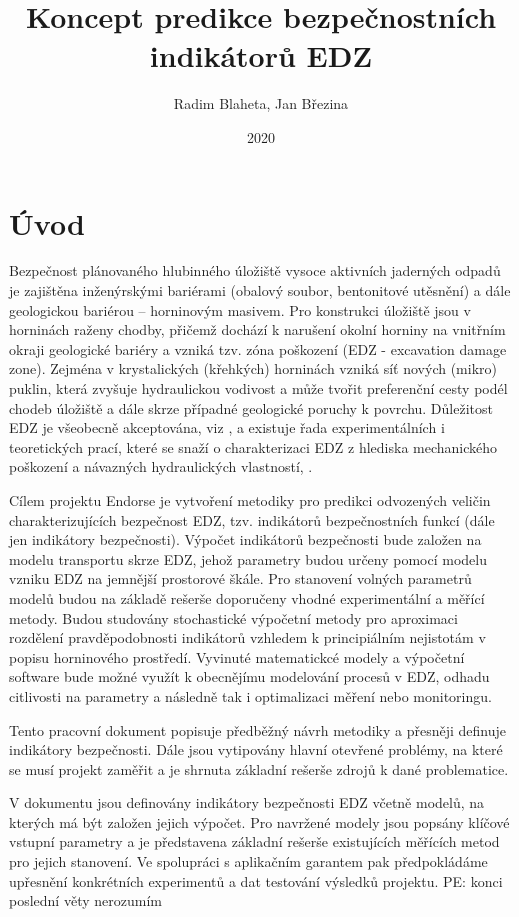 \documentclass{article}
\title{Koncept predikce bezpečnostních indikátorů EDZ}
\author{Radim Blaheta, Jan Březina}
\date{2020}
\newcommand{\pe}[1]{{\color{orange} PE: #1}}
\begin{document}
\maketitle


\section{Úvod}
Bezpečnost plánovaného hlubinného úložiště vysoce aktivních jaderných odpadů je zajištěna 
inženýrskými bariérami (obalový soubor, bentonitové utěsnění) a dále geologickou bariérou 
– horninovým masivem. Pro konstrukci úložiště jsou v horninách raženy chodby, přičemž dochází 
k narušení okolní horniny na vnitřním okraji geologické bariéry a vzniká tzv. zóna poškození 
(EDZ - excavation damage zone). 
Zejména v krystalických (křehkých) horninách vzniká síť nových (mikro) puklin, která zvyšuje 
hydraulickou vodivost a může tvořit preferenční cesty podél 
chodeb úložiště a dále skrze případné geologické poruchy k povrchu.
Důležitost EDZ je všeobecně
akceptována, viz \cite{Pusch2008}, a existuje řada experimentálních i teoretických prací, které se snaží o charakterizaci EDZ z hlediska mechanického poškození a návazných hydraulických vlastností, \cite{Vavro2016}.

Cílem projektu Endorse je vytvoření metodiky pro predikci odvozených veličin charakterizujících 
bezpečnost EDZ, tzv. indikátorů bezpečnostních funkcí (dále jen indikátory bezpečnosti).
Výpočet indikátorů bezpečnosti bude založen na modelu transportu skrze EDZ, 
jehož parametry budou určeny pomocí modelu vzniku EDZ na jemnější prostorové škále. 
Pro stanovení volných parametrů modelů budou na základě rešerše doporučeny vhodné experimentální a měřící metody.
Budou studovány stochastické výpočetní metody pro aproximaci rozdělení pravděpodobnosti indikátorů
vzhledem k principiálním nejistotám v popisu horninového prostředí.
Vyvinuté matematickcé modely a výpočetní software bude možné využít k obecnějímu modelování procesů 
v EDZ, odhadu citlivosti na parametry a následně tak i optimalizaci měření nebo monitoringu.



Tento pracovní dokument popisuje předběžný návrh metodiky a přesněji definuje indikátory 
bezpečnosti. Dále jsou vytipovány hlavní otevřené problémy, na které se musí projekt zaměřit a je 
shrnuta základní rešerše zdrojů k dané problematice. 




V dokumentu jsou definovány indikátory bezpečnosti EDZ včetně modelů, na kterých 
má být založen jejich výpočet. Pro navržené modely jsou popsány klíčové vstupní 
parametry a je představena základní rešerše existujících měřících metod pro jejich
stanovení. Ve spolupráci s aplikačním garantem pak předpokládáme upřesnění konkrétních experimentů
a dat testování výsledků projektu. \pe{konci poslední věty nerozumím}
\end{document}
